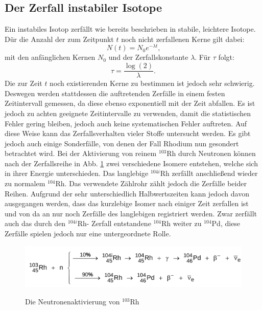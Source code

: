  \subsection{Der Zerfall instabiler Isotope}
 Ein instabiles Isotop zerfällt wie bereits beschrieben in stabile, leichtere Isotope. Dür die Anzahl der zum Zeitpunkt $t$ noch nicht zerfallenen Kerne gilt dabei:
 \begin{equation}
   N(t) = N_0 e^{-\lambda t}\text{,}
   \end{equation}
mit den anfänglichen Kernen $N_0$ und der Zerfallskonstante $\lambda$.
Für $\tau$ folgt:
\begin{equation}
  \tau = \frac{\log(2)}{\lambda}\text{.}\label{T}
\end{equation}
Die zur Zeit $t$ noch existierenden Kerne zu bestimmen ist jedoch sehr schwierig.
Deswegen werden stattdessen die auftretenden Zerfälle in einem festen Zeitintervall gemessen, da diese ebenso exponentiell mit der Zeit abfallen.
Es ist jedoch zu achten geeignete Zeitintervalle zu verwenden, damit die statistischen Fehler gering bleiben, jedoch auch keine systematischen Fehler auftreten.
Auf diese Weise kann das Zerfallsverhalten vieler Stoffe untersucht werden.
Es gibt jedoch auch einige Sonderfälle, von denen der Fall Rhodium nun gesondert betrachtet wird.
Bei der Aktivierung von reinem $^{103}$Rh durch Neutronen können nach der Zerfallsreihe in Abb. \ref{fig:rod}
zwei verschiedene Isomere entstehen, welche sich in ihrer Energie unterschieden. Das langlebige $^{104i}$Rh zerfällt anschließend wieder zu normalem $^{104}$Rh.
Das verwendete Zählrohr zählt jedoch die Zerfälle beider Reihen. Aufgrund der sehr unterschiedlich Halbwertszeiten kann jedoch davon ausgegangen werden, dass das kurzlebige Isomer nach einiger Zeit zerfallen ist und von da an nur noch Zerfälle des langlebigen registriert werden. Zwar zerfällt auch das durch den $^{104i}$Rh- Zerfall entstandene $^{104}$Rh weiter zu $^{104}$Pd, diese Zerfälle spielen jedoch nur eine untergeordnete Rolle.
\begin{figure}
 \centering
 \caption{Die Neutronenaktivierung von $^{103}$Rh \cite{V702}}
 \includegraphics[width=\linewidth-150pt,height=\textheight-150pt,keepaspectratio]{content/rhodium.png}
 \label{fig:rod}
\end{figure}

